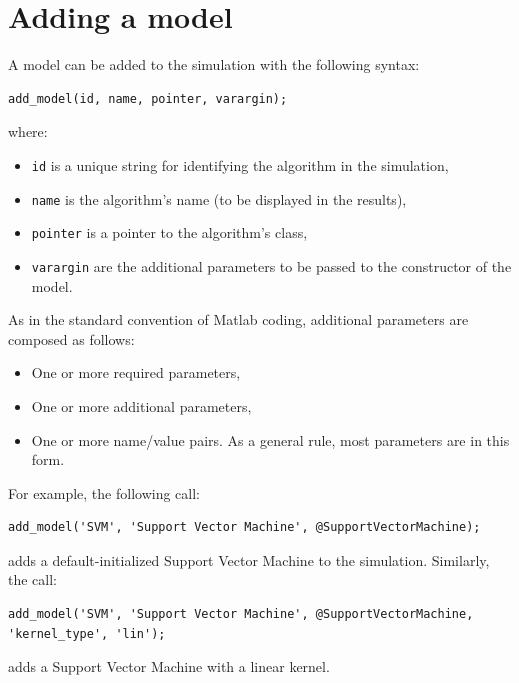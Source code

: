 \section{Adding a model}

A model can be added to the simulation with the following syntax:

\begin{lstlisting}
add_model(id, name, pointer, varargin);
\end{lstlisting}

\noindent where:

\begin{itemize}
	\item \verb|id| is a unique string for identifying the algorithm in the simulation,
	\item \verb|name| is the algorithm's name (to be displayed in the results),
	\item \verb|pointer| is a pointer to the algorithm's class,
	\item \verb|varargin| are the additional parameters to be passed to the constructor of the model.
\end{itemize}

\noindent As in the standard convention of Matlab coding, additional parameters are composed as follows:

\begin{itemize}
	\item One or more required parameters,
	\item One or more additional parameters,
	\item One or more name/value pairs. As a general rule, most parameters are in this form.
\end{itemize}

\noindent For example, the following call:

\begin{lstlisting}
add_model('SVM', 'Support Vector Machine', @SupportVectorMachine);
\end{lstlisting}

\noindent adds a default-initialized Support Vector Machine to the simulation. Similarly, the call:

\begin{lstlisting}
add_model('SVM', 'Support Vector Machine', @SupportVectorMachine, 'kernel_type', 'lin');
\end{lstlisting}

\noindent adds a Support Vector Machine with a linear kernel.

